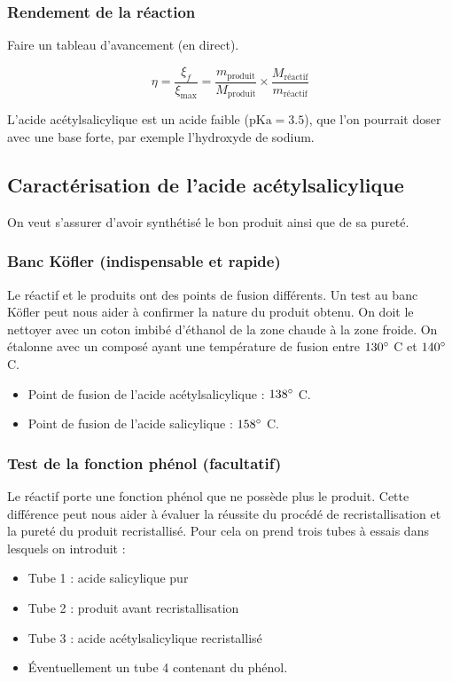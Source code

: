 \documentclass[11pt,a4paper]{report}
\begin{document}
\subsubsection{Rendement de la réaction}

Faire un tableau d'avancement (en direct).

\begin{equation}
	\boxed{\eta = \frac{\xi_f}{\xi_\text{max}}} = \frac{m_\text{produit}}{M_\text{produit}}\times 
	\frac{M_\text{réactif}}{m_\text{réactif}}
\end{equation}

L'acide acétylsalicylique est un acide faible ($\text{pKa} = 3.5$), que l'on pourrait doser avec une base forte, par exemple l'hydroxyde de sodium.

\subsection{Caractérisation de l'acide acétylsalicylique}

On veut s'assurer d'avoir synthétisé le bon produit ainsi que de sa pureté.

\subsubsection{Banc Köfler (indispensable et rapide)}

Le réactif et le produits ont des points de fusion différents. Un test au banc Köfler peut nous aider à confirmer la nature du produit obtenu. On doit le nettoyer avec un coton imbibé d'éthanol de la zone chaude à la zone froide. On étalonne avec un composé ayant une température de fusion entre $130\degree$ C et $140\degree$C.\\

\begin{itemize}
	\item Point de fusion de l'acide acétylsalicylique : $138\degree$ C. 
	\item Point de fusion de l'acide salicylique : $158\degree$ C.\\
\end{itemize}

\subsubsection{Test de la fonction phénol (facultatif)}

Le réactif porte une fonction phénol que ne possède plus le produit. Cette différence peut nous aider à évaluer la réussite du procédé de recristallisation et la pureté du produit recristallisé. Pour cela on prend trois tubes à essais dans lesquels on introduit :
\begin{itemize}
	\item Tube 1 : acide salicylique pur
	\item Tube 2 : produit avant recristallisation
	\item Tube 3 : acide acétylsalicylique recristallisé
	\item Éventuellement un tube 4 contenant du phénol.\\
\end{itemize}
\end{document}

